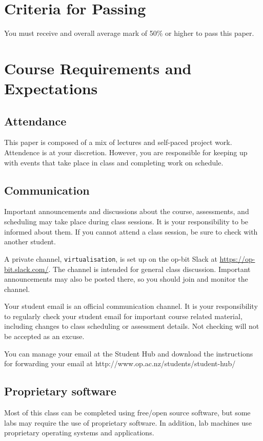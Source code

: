 \documentclass{article}
\begin{document}
\section*{Criteria for Passing}
You must receive and overall average mark of 50\% or higher to pass this paper.

\newpage

\section*{Course Requirements and Expectations}
\subsection*{Attendance}
This paper is composed of a mix of lectures and self-paced project work.  Attendence is at your discretion. 
However, you are responsible for keeping up with events that take place in class and completing work on schedule. 

\subsection*{Communication}
Important announcements and discussions about the course, assessments, and scheduling may take place during class sessions.  It is your responsibility to be informed about them.  If you cannot attend a class session, be sure to check with another student.

A private channel, \texttt{virtualisation}, is set up on the op-bit Slack at \url{https://op-bit.slack.com/}.  The channel is intended for general class discussion.  Important announcements may also be posted there, so you should join and monitor the channel.

Your student email is an official communication channel. It is your responsibility to regularly check your student email for important course related material, including changes to class scheduling or assessment details. Not checking will not be accepted as an excuse.

You can manage your email at the Student Hub and download the instructions for forwarding your email at http://www.op.ac.nz/students/student-hub/

\subsection*{Proprietary software}
Most of this class can be completed using free/open source software, but some labs may require the use of proprietary software.  In addition, lab machines use proprietary operating systems and applications.
\end{document}
